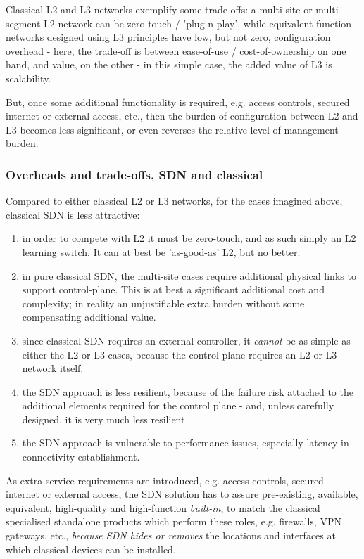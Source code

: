 Classical L2 and L3 networks exemplify some trade-offs: a multi-site or multi-segment L2 network can be zero-touch / 'plug-n-play', while equivalent function networks designed using L3 principles have low, but not zero, configuration overhead - here, the trade-off is between ease-of-use / cost-of-ownership on one hand,  and value, on the other -  in this simple case, the added value of L3 is scalability.

But, once some additional functionality is required, e.g. access controls, secured internet or external access, etc., then the burden of configuration between L2 and L3 becomes less significant, or even reverses the relative level of management burden.

\subsubsection{Overheads and trade-offs, SDN and classical}

Compared to either classical L2 or L3 networks, for the cases imagined above, classical SDN is less attractive:
\begin{enumerate}
    \item in order to compete with L2 it must be zero-touch, and as such simply an L2 learning switch.  It can at best be 'as-good-as' L2, but no better.
    \item in pure classical SDN, the multi-site cases require additional physical links to support control-plane.  This is at best a significant additional cost and complexity; in reality an unjustifiable extra burden without some compensating additional value.
    \item since classical SDN requires an external controller, it \textit{cannot} be as simple as either the L2 or L3 cases, because the control-plane requires an L2 or L3 network itself.
    \item the SDN approach is less resilient, because of the failure risk attached to the additional elements required for the control plane  - and, unless carefully designed, it is very much less resilient
    \item the SDN approach is vulnerable to performance issues, especially latency in connectivity establishment.
\end{enumerate}

As extra service requirements are introduced, e.g. access controls, secured internet or external access, the SDN solution has to assure pre-existing, available, equivalent, high-quality and high-function \textit{built-in}, to match the classical specialised standalone products which perform these roles, e.g. firewalls, VPN gateways, etc., \textit{because SDN hides or removes} the locations and interfaces at which classical devices can be installed.

